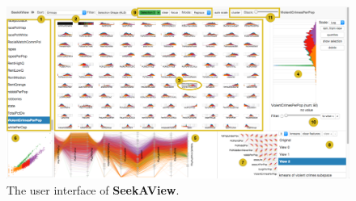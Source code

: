 \begin{figure}[ht!]
\centering
\includegraphics[width=0.9\linewidth]{figs/seekaview/overview}
\caption{
The user interface of \textbf{SeekAView}.
}
\label{figs:seekaview_overview}
\end{figure}